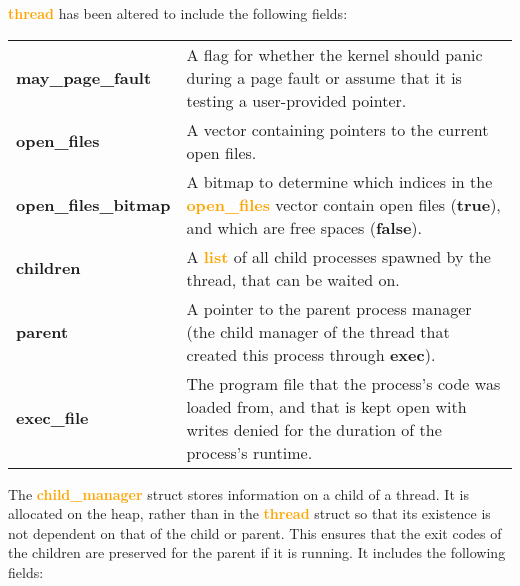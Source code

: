 \documentclass{report}
\newcommand{\fun}[1]{\textcolor{Emerald}{\textbf{#1}}}
\newcommand{\file}[1]{\textcolor{YellowGreen}{\textbf{#1}}}
\newcommand{\struct}[1]{\textcolor{orange}{\textbf{#1}}}
\newcommand{\var}[1]{\textcolor{RoyalPurple}{\textbf{#1}}}
\newcommand{\const}[1]{\textcolor{BrickRed}{\textbf{#1}}}
\newcommand{\pintoscode}[4]{}
\newcommand{\pintosfile}[3]{\pintoscode{#1}{#2}{\file{#3}}{#3}}
\begin{document}
                \pintoscode{95}{134}{\file{thread.h}}{../threads/thread.h}
                \struct{thread} has been altered to include the following fields:
                \begin{center}
                    \begin{tabular}{l p{10cm}}
												\vspace*{2mm}
												\var{may\_page\_fault}    & A flag for whether the kernel should panic during a page fault or assume that it is testing a user-provided pointer. \\ \vspace*{2mm}
                        \var{open\_files}         & A vector containing pointers to the current open files. \\ \vspace*{2mm}
                        \var{open\_files\_bitmap} & A bitmap to determine which indices in the \struct{open\_files} vector contain open files (\const{true}), and which are free spaces (\const{false}). \\ \vspace*{2mm}
                        \var{children}            & A \struct{list} of all child processes spawned by the thread, that can be waited on. \\ \vspace*{2mm}
                        \var{parent}              & A pointer to the parent process manager (the child manager of the thread that created this process through \fun{exec}). \\ \vspace*{2mm}
                        \var{exec\_file}          & The program file that the process's code was loaded from, and that is kept open with writes denied for the duration of the process's runtime.
                    \end{tabular}
                \end{center}
                \pagebreak
                \pintosfile{12}{19}{process.h}
                The \struct{child\_manager} struct stores information on a child of a thread. It is allocated on the heap, rather than in 
                the \struct{thread} struct so that its existence is not dependent on that of the child or parent. This ensures that the exit
                codes of the children are preserved for the parent if it is running. It includes the following fields:
\end{document}
